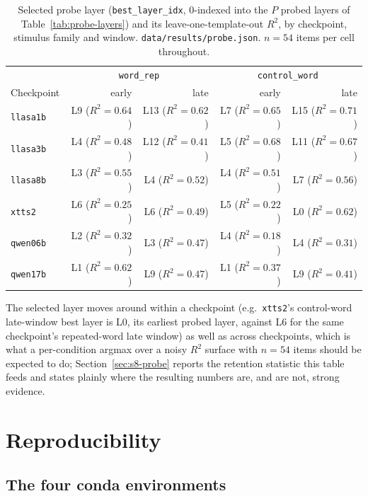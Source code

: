 \documentclass[11pt]{article}
\begin{document}
\begin{table}[h]
\centering
\caption{Selected probe layer (\texttt{best\_layer\_idx}, 0-indexed into the
$P$ probed layers of Table~\ref{tab:probe-layers}) and its leave-one-template-out
$R^2$, by checkpoint, stimulus family and window.
\texttt{data/results/probe.json}. $n{=}54$ items per cell throughout.}
\label{tab:probe-selection}
\small
\begin{tabular}{@{}lrrrr@{}}
\toprule
& \multicolumn{2}{c}{\texttt{word\_rep}} & \multicolumn{2}{c}{\texttt{control\_word}} \\
Checkpoint & early & late & early & late \\
\midrule
\texttt{llasa1b} & L9 ($R^2{=}0.64$) & L13 ($R^2{=}0.62$) & L7 ($R^2{=}0.65$) & L15 ($R^2{=}0.71$) \\
\texttt{llasa3b} & L4 ($R^2{=}0.48$) & L12 ($R^2{=}0.41$) & L5 ($R^2{=}0.68$) & L11 ($R^2{=}0.67$) \\
\texttt{llasa8b} & L3 ($R^2{=}0.55$) & L4 ($R^2{=}0.52$) & L4 ($R^2{=}0.51$) & L7 ($R^2{=}0.56$) \\
\texttt{xtts2} & L6 ($R^2{=}0.25$) & L6 ($R^2{=}0.49$) & L5 ($R^2{=}0.22$) & L0 ($R^2{=}0.62$) \\
\texttt{qwen06b} & L2 ($R^2{=}0.32$) & L3 ($R^2{=}0.47$) & L4 ($R^2{=}0.18$) & L4 ($R^2{=}0.31$) \\
\texttt{qwen17b} & L1 ($R^2{=}0.62$) & L9 ($R^2{=}0.47$) & L1 ($R^2{=}0.37$) & L9 ($R^2{=}0.41$) \\
\bottomrule
\end{tabular}
\end{table}

The selected layer moves around within a checkpoint (e.g.\ \texttt{xtts2}'s
control-word late-window best layer is L0, its earliest probed layer, against
L6 for the same checkpoint's repeated-word late window) as well as across
checkpoints, which is what a per-condition argmax over a noisy $R^2$ surface
with $n=54$ items should be expected to do; Section~\ref{sec:s8-probe} reports
the retention statistic this table feeds and states plainly where the
resulting numbers are, and are not, strong evidence.

\section{Reproducibility}
\label{sec:s7}

\subsection{The four conda environments}
\end{document}
